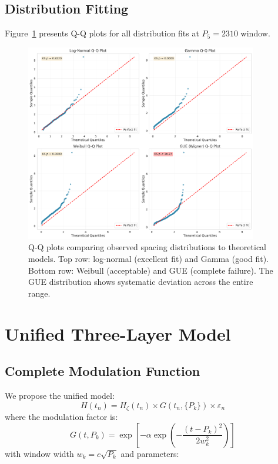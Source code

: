\documentclass[12pt]{article}
\begin{document}
\subsection{Distribution Fitting}

Figure~\ref{fig:s5} presents Q-Q plots for all distribution fits at $P_5 = 2310$ window.

\begin{figure}[htbp]
\centering
\includegraphics[width=0.9\textwidth]{fig_s5_qq_plots.pdf}
\caption{Q-Q plots comparing observed spacing distributions to theoretical models. Top row: log-normal (excellent fit) and Gamma (good fit). Bottom row: Weibull (acceptable) and GUE (complete failure). The GUE distribution shows systematic deviation across the entire range.}
\label{fig:s5}
\end{figure}

\section{Unified Three-Layer Model}

\subsection{Complete Modulation Function}

We propose the unified model:
%
\begin{equation}
H(t_n) = H_{\zeta}(t_n) \times G(t_n, \{P_k\}) \times \varepsilon_n
\end{equation}
%
where the modulation factor is:
%
\begin{equation}
G(t, P_k) = \exp\left[-\alpha \exp\left(-\frac{(t - P_k)^2}{2w_k^2}\right)\right]
\end{equation}
%
with window width $w_k = c\sqrt{P_k}$ and parameters:
\end{document}
